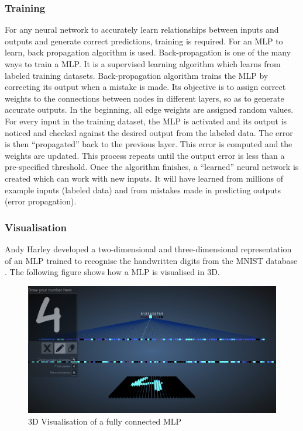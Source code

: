 \subsubsection{Training}
\label{sect5_1_1_2}
For any neural network to accurately learn relationships between inputs and outputs and generate correct predictions, training is required. For an MLP to learn, back propagation algorithm is used.\newline\newline
Back-propagation is one of the many ways to train a MLP. It is a supervised learning algorithm which learns from labeled training datasets. Back-propagation algorithm trains the MLP by correcting its output when a mistake is made. Its objective is to assign correct weights to the connections between nodes in different layers, so as to generate accurate outputs. \newline\newline
In the beginning, all edge weights are assigned random values. For every input in the training dataset, the MLP is activated and its output is noticed and checked against the desired output from the labeled data. The error is then “propagated” back to the previous layer. This error is computed and the weights are updated. This process repeats until the output error is less than a pre-specified threshold.\newline\newline
Once the algorithm finishes, a “learned” neural network is created which can work with new inputs. It will have learned from millions of example inputs (labeled data) and from mistakes made in predicting outputs (error propagation).


\subsubsection{Visualisation}
\label{sect5_1_1_3}
Andy Harley developed a two-dimensional and three-dimensional representation of an MLP trained to recognise the handwritten digits from the \ac{MNIST} database \cite{harley2015isvc}. The following figure shows how a MLP is visualised in 3D.

\begin{figure}[h!]
\centering
\includegraphics[width=12cm]{figures/Fully_Connected_MLP_3D.png}
\caption{3D Visualisation of a fully connected MLP \cite{harley2015isvc}}
\label{fig:cnn5}
\end{figure}


